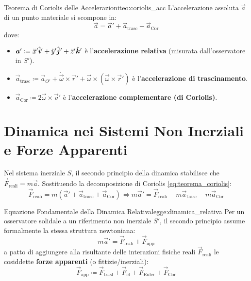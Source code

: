 \begin{teorema}{Teorema di Coriolis delle Accelerazioni}{teo:coriolis_acc}
L'accelerazione assoluta $\vec{a}$ di un punto materiale si scompone in:
\begin{equation}
    \vec{a} = \vec{a}' + \vec{a}_{\text{trasc}} + \vec{a}_{\text{Cor}}
    \label{eq:teorema_coriolis}
\end{equation}
dove:
\begin{itemize}
    \item $\bm{a}' \coloneqq \ddot{x}'\hat{\bm{i}}' + \ddot{y}'\hat{\bm{j}}' + \ddot{z}'\hat{\bm{k}}'$ è l'\textbf{accelerazione relativa} (misurata dall'osservatore in $S'$).
    \item $\vec{a}_{\text{trasc}} \coloneqq \vec{a}_{O'} + \dot{\vec{\omega}}\times\vec{r}' + \vec{\omega}\times(\vec{\omega}\times\vec{r}')$ è l'\textbf{accelerazione di trascinamento}.
    \item $\vec{a}_{\text{Cor}} \coloneqq 2\vec{\omega}\times\vec{v}'$ è l'\textbf{accelerazione complementare (di Coriolis)}.
\end{itemize}
\end{teorema}

\section{Dinamica nei Sistemi Non Inerziali e Forze Apparenti}
\label{sec:forze_apparenti}

Nel sistema inerziale $S$, il secondo principio della dinamica stabilisce che $\vec{F}_{\text{reali}} = m\vec{a}$. Sostituendo la decomposizione di Coriolis \eqref{eq:teorema_coriolis}:
\begin{equation}
    \vec{F}_{\text{reali}} = m(\vec{a}' + \vec{a}_{\text{trasc}} + \vec{a}_{\text{Cor}}) \iff m\vec{a}' = \vec{F}_{\text{reali}} - m\vec{a}_{\text{trasc}} - m\vec{a}_{\text{Cor}}
\end{equation}

\begin{legge}{Equazione Fondamentale della Dinamica Relativa}{legge:dinamica_relativa}
Per un osservatore solidale a un riferimento non inerziale $S'$, il secondo principio assume formalmente la stessa struttura newtoniana:
\begin{equation}
    m\vec{a}' = \vec{F}_{\text{reali}} + \vec{F}_{\text{app}}
    \label{eq:dinamica_non_inerziale}
\end{equation}
a patto di aggiungere alla risultante delle interazioni fisiche reali $\vec{F}_{\text{reali}}$ le cosiddette \textbf{forze apparenti} (o fittizie/inerziali):
\begin{equation}
    \vec{F}_{\text{app}} \coloneqq \vec{F}_{\text{trasl}} + \vec{F}_{\text{cf}} + \vec{F}_{\text{Euler}} + \vec{F}_{\text{Cor}}
\end{equation}
\end{legge}

